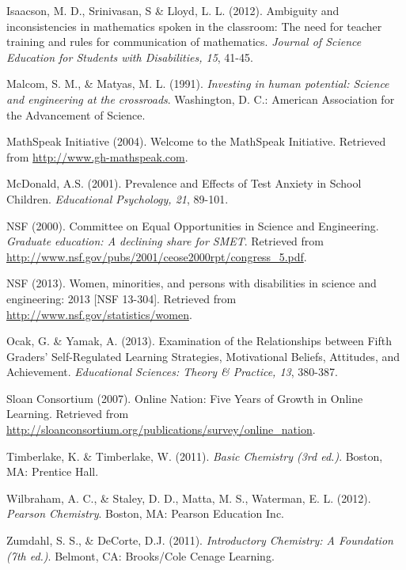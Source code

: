\documentclass[11.5pt]{sig-alternate} %
\begin{document}
Isaacson, M. D., Srinivasan, S \& Lloyd, L. L. (2012). Ambiguity and inconsistencies in mathematics spoken in the classroom: The need for teacher training and rules for communication of mathematics. \textit{Journal of Science Education for Students with Disabilities, 15}, 41-45.

Malcom, S. M., \& Matyas, M. L. (1991). \textit{Investing in human potential: Science and engineering at the crossroads}. Washington, D. C.: American Association for the Advancement of Science.

MathSpeak Initiative (2004). Welcome to the MathSpeak Initiative. Retrieved from \url{http://www.gh-mathspeak.com}.

McDonald, A.S. (2001). Prevalence and Effects of Test Anxiety in School Children. \textit{Educational Psychology, 21}, 89-101.

NSF (2000). Committee on Equal Opportunities in Science and Engineering. \textit{Graduate education: A declining share for SMET}. Retrieved from \url{http://www.nsf.gov/pubs/2001/ceose2000rpt/congress_5.pdf}.

NSF (2013). Women, minorities, and persons with disabilities in science and engineering: 2013 [NSF 13-304]. Retrieved from \url{http://www.nsf.gov/statistics/women}.

Ocak, G. \& Yamak, A. (2013). Examination of the Relationships between Fifth Graders’ Self-Regulated Learning Strategies, Motivational Beliefs, Attitudes, and Achievement. \textit{Educational Sciences: Theory \& Practice, 13}, 380-387.

Sloan Consortium (2007). Online Nation: Five Years of Growth in Online Learning. Retrieved from \url{http://sloanconsortium.org/publications/survey/online_nation}.

Timberlake, K. \& Timberlake, W. (2011). \textit{Basic Chemistry (3rd ed.)}. Boston, MA: Prentice Hall.

Wilbraham, A. C., \& Staley, D. D., Matta, M. S., Waterman, E. L. (2012). \textit{Pearson Chemistry}. Boston, MA: Pearson Education Inc.

Zumdahl, S. S., \& DeCorte, D.J. (2011). \textit{Introductory Chemistry: A Foundation (7th ed.)}. Belmont, CA: Brooks/Cole Cenage Learning.
\end{document}
